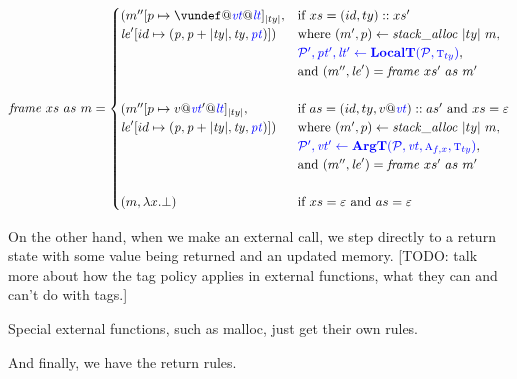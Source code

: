 \documentclass{llncs}
\begin{document}
\[\mathit{frame} ~ xs ~ as ~ \mem =
\begin{cases}
  (\mem''[p \mapsto \vundef@\vt@\lt]_{|ty|}, & \textnormal{if } xs = (id,ty)::xs' \\
  \lenv'[id \mapsto (\mathit{p, p+|ty|,ty,\pt})]) &
  \textnormal{where } (\mem',p) \leftarrow \mathit{stack\_alloc} ~ |ty| ~ \mem, \\
  & \trule{\localtres}{\localt}, \\
  & \textnormal{and } (\mem'',\lenv') = \mathit{frame} ~ xs' ~ as ~ m' \\ 
  \\
  (\mem''[p \mapsto v@\vt'@\lt]_{|ty|}, & \textnormal{if } as = (id,ty,v @ \vt)::as' \textnormal{ and } xs = \varepsilon \\
  \lenv'[id \mapsto (\mathit{p, p+|ty|,ty,\pt})]) &
  \textnormal{where } (\mem',p) \leftarrow \mathit{stack\_alloc} ~ |ty| ~ \mem, \\
  & \trule{\argtres}{\argt}, \\
  & \textnormal{and } (\mem'',\lenv') = \mathit{frame} ~ xs' ~ as ~ m' \\
  \\
  (\mem, \lambda x . \bot) & \textnormal{if } xs = \varepsilon \textnormal{ and } as = \varepsilon \\
\end{cases}\]

\callstep

On the other hand, when we make an external call, we step directly to a return state with some value
being returned and an updated memory. [TODO: talk more about how the tag policy applies in external
  functions, what they can and can't do with tags.]

\extcallstep

Special external functions, such as malloc, just get their own rules.

\mallocstep

And finally, we have the return rules.

\returnstep
\retvalstep
\retnovalstep


  
\end{document}
